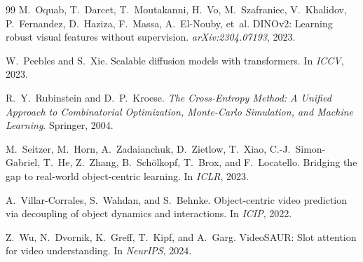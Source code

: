 \documentclass[12pt]{article}
\begin{document}
\begin{thebibliography}{99}
M.~Oquab, T.~Darcet, T.~Moutakanni, H.~Vo, M.~Szafraniec, V.~Khalidov, P.~Fernandez, D.~Haziza, F.~Massa, A.~El-Nouby, et~al.
\newblock DINOv2: Learning robust visual features without supervision.
\newblock \textit{arXiv:2304.07193}, 2023.

W.~Peebles and S.~Xie.
\newblock Scalable diffusion models with transformers.
\newblock In \textit{ICCV}, 2023.

R.~Y.~Rubinstein and D.~P.~Kroese.
\newblock \textit{The Cross-Entropy Method: A Unified Approach to Combinatorial Optimization, Monte-Carlo Simulation, and Machine Learning}.
\newblock Springer, 2004.

M.~Seitzer, M.~Horn, A.~Zadaianchuk, D.~Zietlow, T.~Xiao, C.-J.~Simon-Gabriel, T.~He, Z.~Zhang, B.~Sch\"olkopf, T.~Brox, and F.~Locatello.
\newblock Bridging the gap to real-world object-centric learning.
\newblock In \textit{ICLR}, 2023.

A.~Villar-Corrales, S.~Wahdan, and S.~Behnke.
\newblock Object-centric video prediction via decoupling of object dynamics and interactions.
\newblock In \textit{ICIP}, 2022.

Z.~Wu, N.~Dvornik, K.~Greff, T.~Kipf, and A.~Garg.
\newblock VideoSAUR: Slot attention for video understanding.
\newblock In \textit{NeurIPS}, 2024.

\end{thebibliography}
\end{document}
